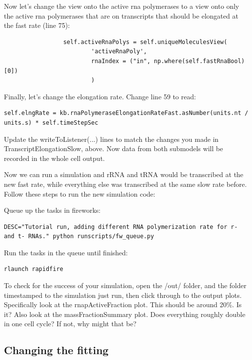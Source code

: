 \documentclass[12pt]{article}
\begin{document}
Now let’s change the view onto the active rna polymerases to a view onto only the active rna polymerases that are on transcripts that should be elongated at the fast rate (line 75):

\begin{lstlisting}
                 self.activeRnaPolys = self.uniqueMoleculesView(
                         'activeRnaPoly',
                         rnaIndex = ("in", np.where(self.fastRnaBool)[0])
                         )
\end{lstlisting}

Finally, let’s change the elongation rate. Change line 59 to read:

\begin{lstlisting}
self.elngRate = kb.rnaPolymeraseElongationRateFast.asNumber(units.nt / units.s) * self.timeStepSec
\end{lstlisting}

Update the writeToListener(...) lines to match the changes you made in TranscriptElongationSlow, above. Now data from both submodels will be recorded in the whole cell output.

\par
Now we can run a simulation and rRNA and tRNA would be transcribed at the new fast rate, while everything else was transcribed at the same slow rate before. Follow these steps to run the new simulation code:
\par
Queue up the tasks in fireworks:

\lstset{language=bash}
\begin{lstlisting}
DESC="Tutorial run, adding different RNA polymerization rate for r- and t- RNAs." python runscripts/fw_queue.py
\end{lstlisting}

Run the tasks in the queue until finished:

\begin{lstlisting}
rlaunch rapidfire
\end{lstlisting}

To check for the success of your simulation, open the /out/ folder, and the folder timestamped to the simulation just run, then click through to the output plots. Specifically look at the rnapActiveFraction plot. This should be around 20\%. Is it? Also look at the massFractionSummary plot. Does everything roughly double in one cell cycle? If not, why might that be?

\subsection{Changing the fitting}
\end{document}
